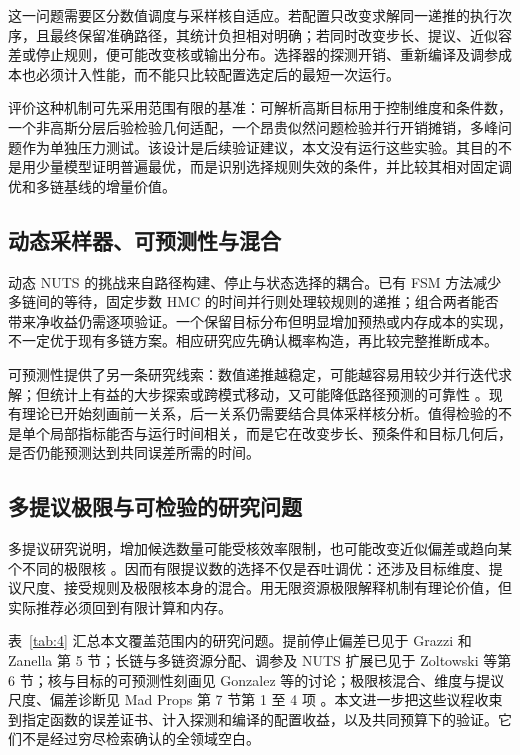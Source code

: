 \documentclass[UTF8,a4paper,zihao=-4,fontset=fandol]{ctexart}
\begin{document}
这一问题需要区分数值调度与采样核自适应。若配置只改变求解同一递推的执行次序，且最终保留准确路径，其统计负担相对明确；若同时改变步长、提议、近似容差或停止规则，便可能改变核或输出分布。选择器的探测开销、重新编译及调参成本也必须计入性能，而不能只比较配置选定后的最短一次运行。

评价这种机制可先采用范围有限的基准：可解析高斯目标用于控制维度和条件数，一个非高斯分层后验检验几何适配，一个昂贵似然问题检验并行开销摊销，多峰问题作为单独压力测试。该设计是后续验证建议，本文没有运行这些实验。其目的不是用少量模型证明普遍最优，而是识别选择规则失效的条件，并比较其相对固定调优和多链基线的增量价值。

\subsection{动态采样器、可预测性与混合}

动态 NUTS 的挑战来自路径构建、停止与状态选择的耦合。已有 FSM 方法减少多链间的等待，固定步数 HMC 的时间并行则处理较规则的递推；组合两者能否带来净收益仍需逐项验证。一个保留目标分布但明显增加预热或内存成本的实现，不一定优于现有多链方案。相应研究应先确认概率构造，再比较完整推断成本。

可预测性提供了另一条研究线索：数值递推越稳定，可能越容易用较少并行迭代求解；但统计上有益的大步探索或跨模式移动，又可能降低路径预测的可靠性 \cite{gonzalez2025predict,gonzalez2026}。现有理论已开始刻画前一关系，后一关系仍需要结合具体采样核分析。值得检验的不是单个局部指标能否与运行时间相关，而是它在改变步长、预条件和目标几何后，是否仍能预测达到共同误差所需的时间。

\subsection{多提议极限与可检验的研究问题}

多提议研究说明，增加候选数量可能受核效率限制，也可能改变近似偏差或趋向某个不同的极限核 \cite{pozza2025,glattholtz2026}。因而有限提议数的选择不仅是吞吐调优：还涉及目标维度、提议尺度、接受规则及极限核本身的混合。用无限资源极限解释机制有理论价值，但实际推荐必须回到有限计算和内存。

表~\ref{tab:4} 汇总本文覆盖范围内的研究问题。提前停止偏差已见于 Grazzi 和 Zanella 第 5 节；长链与多链资源分配、调参及 NUTS 扩展已见于 Zoltowski 等第 6 节；核与目标的可预测性刻画见 Gonzalez 等的讨论；极限核混合、维度与提议尺度、偏差诊断见 Mad Props 第 7 节第 1 至 4 项 \cite{grazzi2026,zoltowski2025,gonzalez2025predict,glattholtz2026}。本文进一步把这些议程收束到指定函数的误差证书、计入探测和编译的配置收益，以及共同预算下的验证。它们不是经过穷尽检索确认的全领域空白。
\end{document}

